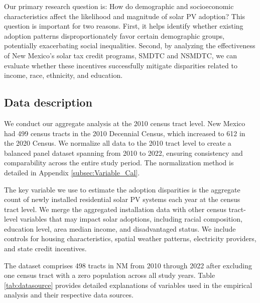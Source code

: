 \documentclass[12pt,twoside,letterpaper]{article}
\begin{document}
Our primary research question is: How do demographic and socioeconomic characteristics affect the likelihood and magnitude of solar PV adoption? This question is important for two reasons. First, it helps identify whether existing adoption patterns disproportionately favor certain demographic groups, potentially exacerbating social inequalities. Second, by analyzing the effectiveness of New Mexico's solar tax credit programs, SMDTC and NSMDTC, we can evaluate whether these incentives successfully mitigate disparities related to income, race, ethnicity, and education. 

\subsection{Data description}

We conduct our aggregate analysis at the 2010 census tract level. New Mexico had 499 census tracts in the 2010 Decennial Census, which increased to 612 in the 2020 Census. We normalize all data to the 2010 tract level to create a balanced panel dataset spanning from 2010 to 2022, ensuring consistency and comparability across the entire study period. The normalization method is detailed in Appendix \ref{subsec:Variable_Cal}.

The key variable we use to estimate the adoption disparities is the aggregate count of newly installed residential solar PV systems each year at the census tract level. We merge the aggregated installation data with other census tract-level variables that may impact solar adoptions, including racial composition, education level, area median income, and disadvantaged status. We include controls for housing characteristics, spatial weather patterns, electricity providers, and state credit incentives.

The dataset comprises 498 tracts in NM from 2010 through 2022 after excluding one census tract with a zero population across all study years. Table \ref{tab:datasource} provides detailed explanations of variables used in the empirical analysis and their respective data sources. 
\end{document}
